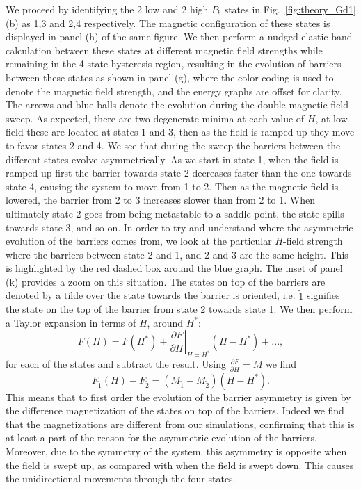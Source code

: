 We proceed by identifying the 2 low and 2 high $P_b$ states in Fig.~\ref{fig:theory_Gd1}(b) as 1,3 and 2,4 respectively. The magnetic configuration of these states is displayed in panel (h) of the same figure. We then perform a nudged elastic band calculation between these states at different magnetic field strengths while remaining in the 4-state hysteresis region, resulting in the evolution of barriers between these states as shown in panel (g), where the color coding is used to denote the magnetic field strength, and the energy graphs are offset for clarity. The arrows and blue balls denote the evolution during the double magnetic field sweep. As expected, there are two degenerate minima at each value of $H$, at low field these are located at states 1 and 3, then as the field is ramped up they move to favor states 2 and 4. We see that during the sweep the barriers between the different states evolve asymmetrically. As we start in state 1, when the field is ramped up first the barrier towards state 2 decreases faster than the one towards state 4, causing the system to move from 1 to 2. Then as the magnetic field is lowered, the barrier from 2 to 3 increases slower than from 2 to 1. When ultimately state 2 goes from being metastable to a saddle point, the state spills towards state 3, and so on.
In order to try and understand where the asymmetric evolution of the barriers comes from, we look at the particular $H$-field strength where the barriers between state 2 and 1, and 2 and 3 are the same height. This is highlighted by the red dashed box around the blue graph. The inset of panel (k) provides a zoom on this situation. The states on top of the barriers are denoted by a tilde over the state towards the barrier is oriented, i.e. $\tilde{1}$ signifies the state on the top of the barrier from state 2 towards state 1. We then perform a Taylor expansion in terms of $H$, around $H^*$:
\begin{equation}
	F(H) = F(H^*) + \left.\frac{\partial F}{\partial H}\right\rvert_{H=H^*} (H-H^*) + ...,
\end{equation}
for each of the states and subtract the result. Using $\frac{\partial F}{\partial H} = M$ we find
\begin{equation}
	F_{\tilde{1}}(H) - F_{\tilde{2}} = (M_{\tilde{1}} - M_{\tilde{2}}) (H - H^*).
\end{equation}
This means that to first order the evolution of the barrier asymmetry is given by the difference magnetization of the states on top of the barriers. Indeed we find that the magnetizations are different from our simulations, confirming that this is at least a part of the reason for the asymmetric evolution of the barriers. Moreover, due to the symmetry of the system, this asymmetry is opposite when the field is swept up, as compared with when the field is swept down. This causes the unidirectional movements through the four states.

